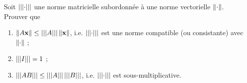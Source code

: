 Soit $\triple{\cdot}$ une norme matricielle subordonnée à une norme vectorielle $\norm{\cdot}$.
Prouver que

\begin{enumerate}[label=\alph*)]
  \item $\norm{A \BoldX} \leq \triple{A} \norm{\BoldX}$, i.e. $\triple{\cdot}$ est une norme compatible (ou consistante) avec $\norm{\cdot}$ ;
  \item $\triple{I} = 1$ ;
  \item $\triple{A B} \leq \triple{A} \triple{B}$, i.e. $\triple{\cdot}$ est sous-multiplicative.
\end{enumerate}